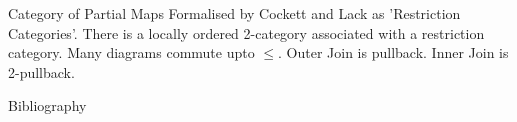 \documentclass[xcolor=pst,dvips]{beamer}   %
\begin{document}
\begin{frame}{Category of Partial Maps}
Formalised by Cockett and Lack as 'Restriction Categories'.
There is a locally ordered 2-category associated with a restriction category.
Many diagrams commute upto $\leq$.
Outer Join is pullback.
Inner Join is 2-pullback.
\end{frame}

\begin{frame}{Bibliography}
{\tiny

}
\end{frame}
\end{document}
